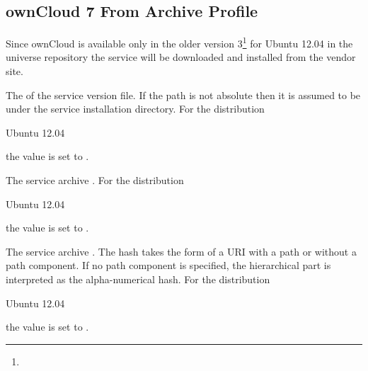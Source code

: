 \label{sec:owncloud_7_fromarchive_profile}
\subsection{ownCloud 7 From Archive Profile}

Since ownCloud is available only in the older
version 3\footnote{} for Ubuntu 12.04
in the universe repository the service will be downloaded and installed
from the vendor site.


The  of the service version file. If the path is not absolute
then it is assumed to be under the service installation directory.
For the distribution
\begin{inparaitem}
\item[\TheDistribution{ubuntu}] Ubuntu 12.04
\end{inparaitem}
the value is set to .


The service archive .
For the distribution
\begin{inparaitem}
\item[\TheDistribution{ubuntu}] Ubuntu 12.04
\end{inparaitem}
the value is set to 
.


The service archive . The hash takes the form of a URI with a path
or without a path component. If no path component is specified, the hierarchical part
is interpreted as the alpha-numerical hash.
For the distribution
\begin{inparaitem}
\item[\TheDistribution{ubuntu}] Ubuntu 12.04
\end{inparaitem}
the value is set to .

